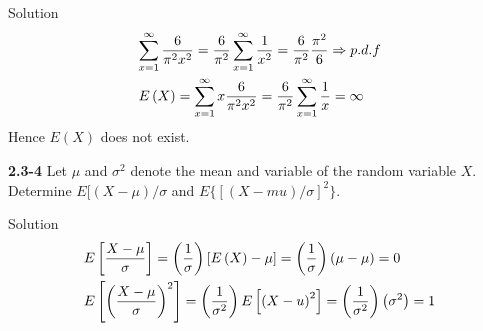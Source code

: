 \documentclass{article}
\begin{document}
\begin{spacing}{1.1}
\begin{homeworkProblem}
	\begin{homeworkSection}{Solution}
		\[\begin{gathered}
  \sum\limits_{x = 1}^\infty  {\frac{6}{{{\pi ^2}{x^2}}}}  = \frac{6}{{{\pi ^2}}}\sum\limits_{x = 1}^\infty  {\frac{1}{{{x^2}}}}  = \frac{6}{{{\pi ^2}}}\frac{{{\pi ^2}}}{6} \Rightarrow p.d.f \hfill \\
  E\left( X \right) = \sum\limits_{x = 1}^\infty  {x\frac{6}{{{\pi ^2}{x^2}}}}  = \frac{6}{{{\pi ^2}}}\sum\limits_{x = 1}^\infty  {\frac{1}{x}}  = \infty  \hfill \\ 
\end{gathered} \]
		Hence $E(X)$ does not exist.
	\end{homeworkSection}
\end{homeworkProblem}
\begin{homeworkProblem}
	{\bf 2.3-4}	 Let $\mu$ and $\sigma^2$ denote the mean and variable of the random variable $X$.  Determine $E[(X - \mu)/ \sigma$ and $E\{[ (X - mu)/\sigma]^2\}$.  
	\begin{homeworkSection}{Solution}
		\[\begin{gathered}
  E\left[ {\frac{{X - \mu }}{\sigma }} \right] = \left( {\frac{1}{\sigma }} \right)\left[ {E\left( X \right) - \mu } \right] = \left( {\frac{1}{\sigma }} \right)\left( {\mu  - \mu } \right) = 0 \hfill \\
  E\left[ {{{\left( {\frac{{X - \mu }}{\sigma }} \right)}^2}} \right] = \left( {\frac{1}{{{\sigma ^2}}}} \right)E\left[ {{{\left( {X - u} \right)}^2}} \right] = \left( {\frac{1}{{{\sigma ^2}}}} \right)\left( {{\sigma ^2}} \right) = 1 \hfill \\ 
\end{gathered} \]
	\end{homeworkSection}
\end{homeworkProblem}

\end{spacing}
\end{document}
